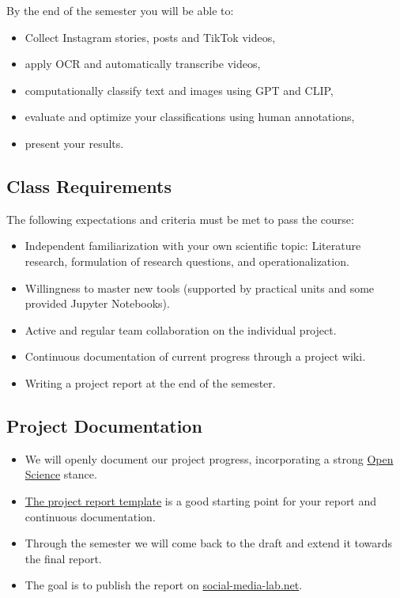 \documentclass[
  letterpaper,
  DIV=11,
  numbers=noendperiod]{scrartcl}
\providecommand{\tightlist}{%
  \setlength{\itemsep}{0pt}\setlength{\parskip}{0pt}}\usepackage{longtable,booktabs,array}
\begin{document}
By the end of the semester you will be able to:

\begin{itemize}
\tightlist
\item
  Collect Instagram stories, posts and TikTok videos,
\item
  apply OCR and automatically transcribe videos,
\item
  computationally classify text and images using GPT and CLIP,
\item
  evaluate and optimize your classifications using human annotations,
\item
  present your results.
\end{itemize}

\hypertarget{class-requirements}{%
\subsection{Class Requirements}\label{class-requirements}}

The following expectations and criteria must be met to pass the course:

\begin{itemize}
\tightlist
\item
  Independent familiarization with your own scientific topic: Literature
  research, formulation of research questions, and operationalization.
\item
  Willingness to master new tools (supported by practical units and some
  provided Jupyter Notebooks).
\item
  Active and regular team collaboration on the individual project.
\item
  Continuous documentation of current progress through a project wiki.
\item
  Writing a project report at the end of the semester.
\end{itemize}

\hypertarget{project-documentation}{%
\subsection{Project Documentation}\label{project-documentation}}

\begin{itemize}
\tightlist
\item
  We will openly document our project progress, incorporating a strong
  \href{https://en.wikipedia.org/wiki/Open_science}{Open Science}
  stance.
\item
  \href{https://docs.google.com/document/d/1hCMQlDF85S5ua9dzhJ280gQzbbheo4zJvoVUwYAIdqg/edit?usp=sharing}{The
  project report template} is a good starting point for your report and
  continuous documentation.
\item
  Through the semester we will come back to the draft and extend it
  towards the final report.
\item
  The goal is to publish the report on
  \href{https://social-media-lab.net}{social-media-lab.net}.
\end{itemize}
\end{document}
